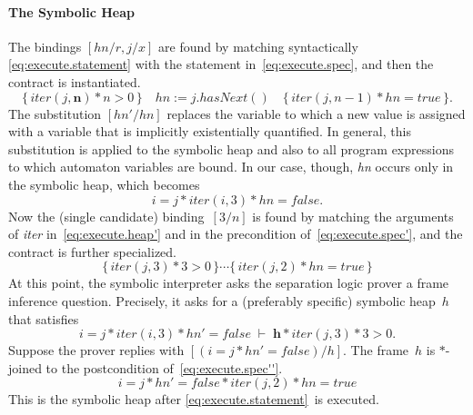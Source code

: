 \documentclass[a4paper]{article}
\theoremstyle{remark}
\begin{document}
\paragraph{The Symbolic Heap} %

The bindings $[\mathit{hn}/r,j/x]$ are found by matching syntactically \eqref{eq:execute.statement} with the statement in~\eqref{eq:execute.spec}, and then the contract is instantiated.
\begin{equation}\label{eq:execute.spec'}
\{\,\mathit{iter}(j, \mathbf{n})*n>0\,\}
  \quad \mathit{hn} := j.\mathit{hasNext}()
  \quad \{\,\mathit{iter}(j, n-1)*\mathit{hn}=\mathit{true}\,\}.
\end{equation}
The substitution $[\mathit{hn}'/\mathit{hn}]$ replaces the variable to which a new value is assigned with a variable that is implicitly existentially quantified.
In general, this substitution is applied to the symbolic heap and also to all program expressions to which automaton variables are bound.
In our case, though, \textit{hn} occurs only in the symbolic heap, which becomes
\begin{equation}\label{eq:execute.heap'}
i=j * \mathit{iter}(i,3) * \mathit{hn} = \mathit{false}.
\end{equation}
Now the (single candidate) binding~$[3/n]$ is found by matching the arguments of \textit{iter} in~\eqref{eq:execute.heap'} and in the precondition of~\eqref{eq:execute.spec'}, and the contract is further specialized.
\begin{equation}\label{eq:execute.spec''}
\{\,\mathit{iter}(j,3)*3>0\,\}\cdots
\{\,\mathit{iter}(j,2)*\mathit{hn}=\mathit{true}\,\}
\end{equation}
At this point, the symbolic interpreter asks the separation logic prover a frame inference question.
Precisely, it asks for a (preferably specific) symbolic heap~$h$ that satisfies
\begin{equation}\label{eq:execute:frame_question}
i=j*\mathit{iter}(i,3)*\mathit{hn}'=\mathit{false}
\;\vdash\;
\mathbf{h}*\mathit{iter}(j,3)*3>0.
\end{equation}
Suppose the prover replies with $[(i=j*\mathit{hn}'=\mathit{false})/h]$.
The frame~$h$ is $*$-joined to the postcondition of~\eqref{eq:execute.spec''}.
\begin{equation}\label{eq:execute.heap''}
i=j*\mathit{hn}'=\mathit{false}*\mathit{iter}(j,2)*\mathit{hn}=\mathit{true}
\end{equation}
This is the symbolic heap after \eqref{eq:execute.statement}~is executed.
\end{document}

